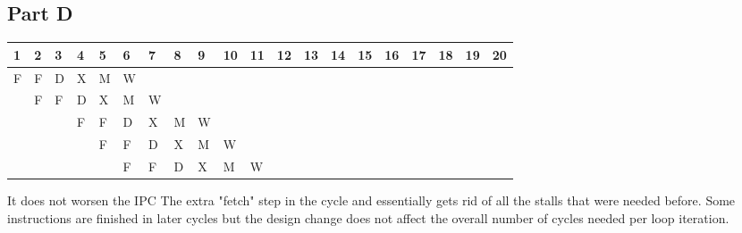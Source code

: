 \documentclass[letter]{article}
\theoremstyle{case}
\begin{document}
\subsection*{Part D}
\begin{table}[!h]
\centering
\begin{tabular}{l|l|l|l|l|l|l|l|l|l|l|l|l|l|l|l|l|l|l|l}
1                       & 2 & 3 & 4 & 5 & 6 & 7 & 8 & 9 & 10 & 11 & 12 & 13 & 14 & 15 & 16 & 17 & 18 & 19 & 20                    \\ \hline
\multicolumn{1}{|l|}{F} & F & D & X & M & W &   &   &   &    &    &    &    &    &    &    &    &    &    & \multicolumn{1}{l|}{} \\ \hline
\multicolumn{1}{|l|}{}  & F & F & D & X & M & W &   &   &    &    &    &    &    &    &    &    &    &    & \multicolumn{1}{l|}{} \\ \hline
\multicolumn{1}{|l|}{}  &   &   & F & F & D & X & M & W &    &    &    &    &    &    &    &    &    &    & \multicolumn{1}{l|}{} \\ \hline
\multicolumn{1}{|l|}{}  &   &   &   & F & F & D & X & M & W  &    &    &    &    &    &    &    &    &    & \multicolumn{1}{l|}{} \\ \hline
\multicolumn{1}{|l|}{}  &   &   &   &   & F & F & D & X & M  & W  &    &    &    &    &    &    &    &    & \multicolumn{1}{l|}{} \\ \hline
\end{tabular}
\end{table}
It does not worsen the IPC The extra "fetch" step in the cycle and essentially gets rid of all the stalls that were needed before. Some instructions are finished in later cycles but the design change does not affect the overall number of cycles needed per loop iteration.
\end{document}
